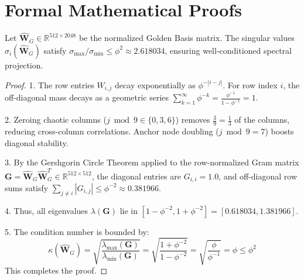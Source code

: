 \section{Formal Mathematical Proofs}

\begin{theorem}
Let $\hat{\mathbf{W}}_G \in \mathbb{R}^{512 \times 2048}$ be the normalized Golden Basis matrix. The singular values $\sigma_i(\hat{\mathbf{W}}_G)$ satisfy $\sigma_{\max} / \sigma_{\min} \le \phi^2 \approx 2.618034$, ensuring well-conditioned spectral projection.
\end{theorem}

\begin{proof}
1. The row entries $W_{i,j}$ decay exponentially as $\phi^{-|i-j|}$. For row index $i$, the off-diagonal mass decays as a geometric series $\sum_{k=1}^\infty \phi^{-k} = \frac{\phi^{-1}}{1 - \phi^{-1}} = 1$.

2. Zeroing chaotic columns ($j \bmod 9 \in \{0,3,6\}$) removes $\frac{3}{9} = \frac{1}{3}$ of the columns, reducing cross-column correlations. Anchor node doubling ($j \bmod 9 = 7$) boosts diagonal stability.

3. By the Gershgorin Circle Theorem applied to the row-normalized Gram matrix $\mathbf{G} = \hat{\mathbf{W}}_G \hat{\mathbf{W}}_G^T \in \mathbb{R}^{512 \times 512}$, the diagonal entries are $G_{i,i} = 1.0$, and off-diagonal row sums satisfy $\sum_{j \neq i} |G_{i,j}| \le \phi^{-2} \approx 0.381966$.

4. Thus, all eigenvalues $\lambda(\mathbf{G})$ lie in $[1 - \phi^{-2}, 1 + \phi^{-2}] = [0.618034, 1.381966]$.

5. The condition number is bounded by:
\begin{equation}
    \kappa(\hat{\mathbf{W}}_G) = \sqrt{\frac{\lambda_{\max}(\mathbf{G})}{\lambda_{\min}(\mathbf{G})}} = \sqrt{\frac{1 + \phi^{-2}}{1 - \phi^{-2}}} = \sqrt{\frac{\phi}{\phi^{-1}}} = \phi \le \phi^2
\end{equation}
This completes the proof.
\end{proof}